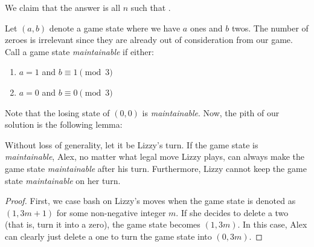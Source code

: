 \documentclass[10pt]{../usamts}
\begin{document}
\begin{solution}
We claim that the answer is all $n$ such that .

Let $(a,b)$ denote a game state where we have $a$ ones and $b$ twos. The number of zeroes is irrelevant since they are already out of consideration from our game.
Call a game state \textit{maintainable} if either:
\begin{enumerate}
    \item $a = 1$ and $b \equiv 1 \pmod 3$
    \item $a = 0$ and $b \equiv 0 \pmod 3$
\end{enumerate}
Note that the losing state of $(0,0)$ is \textit{maintainable}. Now, the pith of our solution is the following lemma:
\begin{claim}
    Without loss of generality, let it be Lizzy's turn. If the game state is \textit{maintainable}, Alex, no matter what legal move Lizzy plays, can always make the game state \textit{maintainable} after his turn. Furthermore, Lizzy cannot keep the game state \textit{maintainable} on her turn.
\end{claim}
\begin{proof}
    First, we case bash on Lizzy's moves when the game state is denoted as $(1, 3m+1)$ for some non-negative integer $m$.
    If she decides to delete a two (that is, turn it into a zero), the game state becomes $(1, 3m)$. In this case, Alex can clearly just delete a one to turn the game state into $(0,3m)$.


\end{proof}
\end{solution}
\end{document}
